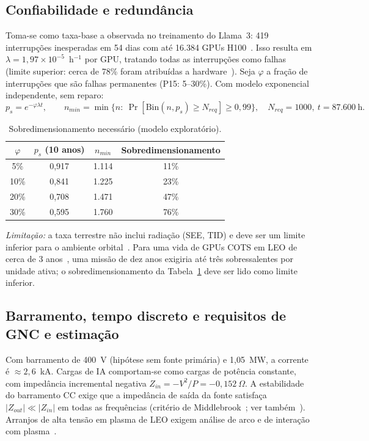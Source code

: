 \documentclass[11pt,a4paper]{article}
\begin{document}
\subsection{Confiabilidade e redundância}\label{sec:conf}

Toma-se como taxa-base a observada no treinamento do Llama~3: 419 interrupções
inesperadas em 54 dias com até 16.384 GPUs H100~\cite{r36}. Isso resulta em
$\lambda=1{,}97\times10^{-5}$~h$^{-1}$ por GPU, tratando todas as interrupções
como falhas (limite superior: cerca de 78\% foram atribuídas a
hardware~\cite{r36}). Seja $\varphi$ a fração de interrupções que são falhas
permanentes (P15: 5--30\%). Com modelo exponencial independente, sem reparo:
\begin{equation}
  p_s=e^{-\varphi\lambda t},\qquad
  n_{min}=\min\Big\{n:\ \Pr[\mathrm{Bin}(n,p_s)\ge N_{req}]\ge0{,}99\Big\},\quad
  N_{req}=1000,\ t=87.600~\text{h}.
  \label{eq:rel}
\end{equation}

\begin{table}[ht]
\centering
\caption{Sobredimensionamento necessário (modelo exploratório).}
\label{tab:rel}
\small
\begin{tabular}{@{}cccc@{}}
\toprule
$\varphi$ & $p_s$ (10 anos) & $n_{min}$ & Sobredimensionamento\\
\midrule
5\%  & 0,917 & 1.114 & 11\%\\
10\% & 0,841 & 1.225 & 23\%\\
20\% & 0,708 & 1.471 & 47\%\\
30\% & 0,595 & 1.760 & 76\%\\
\bottomrule
\end{tabular}
\end{table}

\emph{Limitação:} a taxa terrestre não inclui radiação (SEE, TID) e deve ser um
limite inferior para o ambiente orbital~\cite{r48}. Para uma vida de GPUs COTS
em LEO de cerca de 3 anos~\cite{r19}, uma missão de dez anos exigiria até três
sobressalentes por unidade ativa; o sobredimensionamento da
Tabela~\ref{tab:rel} deve ser lido como limite inferior.

\subsection{Barramento, tempo discreto e requisitos de GNC e estimação}

Com barramento de 400~V (hipótese sem fonte primária) e 1,05~MW, a corrente é
$\approx 2{,}6$~kA. Cargas de IA comportam-se como cargas de potência constante,
com impedância incremental negativa $Z_{in}=-V^{2}/P=-0{,}152~\Omega$. A
estabilidade do barramento CC exige que a impedância de saída da fonte
satisfaça $|Z_{out}|\ll|Z_{in}|$ em todas as frequências (critério de
Middlebrook~\cite{r34}; ver também~\cite{r33}). Arranjos de alta tensão em
plasma de LEO exigem análise de arco e de interação com plasma~\cite{r35}.
\end{document}
